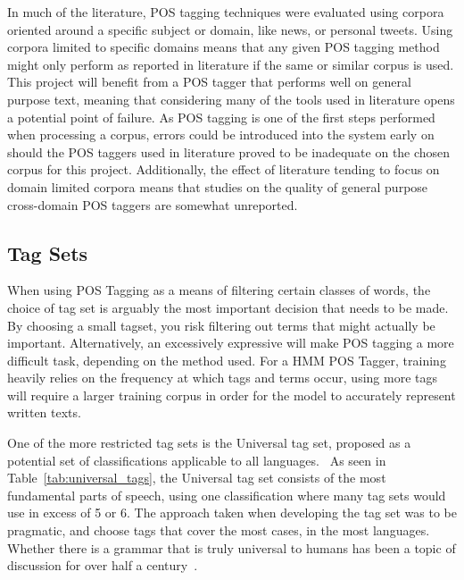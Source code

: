 \documentclass[10pt]{report}
\begin{document}
In much of the literature, POS tagging techniques were evaluated using corpora oriented around a specific subject or domain, like news, or personal tweets. Using corpora limited to specific domains means that any given POS tagging method might only perform as reported in literature if the same or similar corpus is used. This project will benefit from a POS tagger that performs well on general purpose text, meaning that considering many of the tools used in literature opens a potential point of failure. As POS tagging is one of the first steps performed when processing a corpus, errors could be introduced into the system early on should the POS taggers used in literature proved to be inadequate on the chosen corpus for  this project. Additionally, the effect of literature tending to focus on domain limited corpora means that studies on the quality of general purpose cross-domain POS taggers are somewhat unreported.

\subsection{Tag Sets}
When using POS Tagging as a means of filtering certain classes of words, the choice of tag set is arguably the most important decision that needs to be made. By choosing a small tagset, you risk filtering out terms that might actually be important. Alternatively, an excessively expressive will make POS tagging a more difficult task, depending on the method used. For a HMM POS Tagger, training heavily relies on the frequency at which tags and terms occur, using more tags will require a larger training corpus in order for the model to accurately represent written texts.

One of the more restricted tag sets is the Universal tag set, proposed as a potential set of classifications applicable to all languages.~\cite{DBLP:journals/corr/abs-1104-2086} As seen in Table~\ref{tab:universal_tags}, the Universal tag set consists of the most fundamental parts of speech, using one classification where many tag sets would use in excess of 5 or 6. The approach taken when developing the tag set was to be pragmatic, and choose tags that cover the most cases, in the most languages. Whether there is a grammar that is truly universal to humans has been a topic of discussion for over half a century~\cite{Dabrowska2015-qm}.
\end{document}

